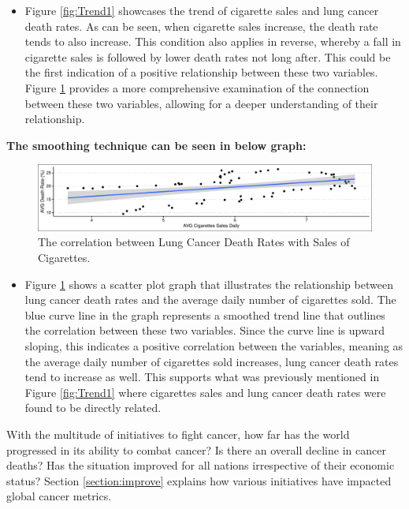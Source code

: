 \documentclass[11pt,a4paper,]{article}
\providecommand{\tightlist}{%
  \setlength{\itemsep}{0pt}\setlength{\parskip}{0pt}}
\begin{document}
\begin{itemize}
\tightlist
\item
  Figure \ref{fig:Trend1} showcases the trend of cigarette sales and lung cancer death rates. As can be seen, when cigarette sales increase, the death rate tends to also increase. This condition also applies in reverse, whereby a fall in cigarette sales is followed by lower death rates not long after. This could be the first indication of a positive relationship between these two variables. Figure \ref{fig:CorrViz} provides a more comprehensive examination of the connection between these two variables, allowing for a deeper understanding of their relationship.
\end{itemize}

\textbf{The smoothing technique can be seen in below graph:}

\begin{figure}

{\centering \includegraphics[width=1\linewidth]{etc5513_assignment2_g1_t1_files/figure-latex/CorrViz-1} 

}

\caption{The correlation between Lung Cancer Death Rates with Sales of Cigarettes.}\label{fig:CorrViz}
\end{figure}

\begin{itemize}
\tightlist
\item
  Figure \ref{fig:CorrViz} shows a scatter plot graph that illustrates the relationship between lung cancer death rates and the average daily number of cigarettes sold. The blue curve line in the graph represents a smoothed trend line that outlines the correlation between these two variables. Since the curve line is upward sloping, this indicates a positive correlation between the variables, meaning as the average daily number of cigarettes sold increases, lung cancer death rates tend to increase as well. This supports what was previously mentioned in Figure \ref{fig:Trend1} where cigarettes sales and lung cancer death rates were found to be directly related.
\end{itemize}

With the multitude of initiatives to fight cancer, how far has the world progressed in its ability to combat cancer? Is there an overall decline in cancer deaths? Has the situation improved for all nations irrespective of their economic status? Section \ref{section:improve} explains how various initiatives have impacted global cancer metrics.
\end{document}
